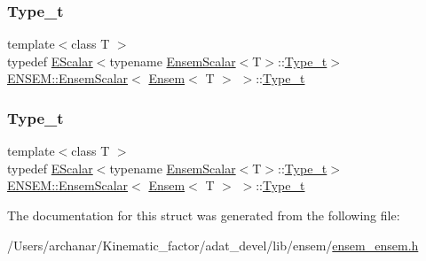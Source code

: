\subsubsection{\texorpdfstring{Type\_t}{Type\_t}\hspace{0.1cm}{\footnotesize\ttfamily [1/2]}}
{\footnotesize\ttfamily template$<$class T $>$ \\
typedef \mbox{\hyperlink{classENSEM_1_1EScalar}{E\+Scalar}}$<$typename \mbox{\hyperlink{structENSEM_1_1EnsemScalar}{Ensem\+Scalar}}$<$T$>$\+::\mbox{\hyperlink{structENSEM_1_1EnsemScalar_3_01Ensem_3_01T_01_4_01_4_a7452a3e2409e2d8a2ae3ea41eec32972}{Type\+\_\+t}}$>$ \mbox{\hyperlink{structENSEM_1_1EnsemScalar}{E\+N\+S\+E\+M\+::\+Ensem\+Scalar}}$<$ \mbox{\hyperlink{classENSEM_1_1Ensem}{Ensem}}$<$ T $>$ $>$\+::\mbox{\hyperlink{structENSEM_1_1EnsemScalar_3_01Ensem_3_01T_01_4_01_4_a7452a3e2409e2d8a2ae3ea41eec32972}{Type\+\_\+t}}}

\mbox{\label{structENSEM_1_1EnsemScalar_3_01Ensem_3_01T_01_4_01_4_a7452a3e2409e2d8a2ae3ea41eec32972}} 
\subsubsection{\texorpdfstring{Type\_t}{Type\_t}\hspace{0.1cm}{\footnotesize\ttfamily [2/2]}}
{\footnotesize\ttfamily template$<$class T $>$ \\
typedef \mbox{\hyperlink{classENSEM_1_1EScalar}{E\+Scalar}}$<$typename \mbox{\hyperlink{structENSEM_1_1EnsemScalar}{Ensem\+Scalar}}$<$T$>$\+::\mbox{\hyperlink{structENSEM_1_1EnsemScalar_3_01Ensem_3_01T_01_4_01_4_a7452a3e2409e2d8a2ae3ea41eec32972}{Type\+\_\+t}}$>$ \mbox{\hyperlink{structENSEM_1_1EnsemScalar}{E\+N\+S\+E\+M\+::\+Ensem\+Scalar}}$<$ \mbox{\hyperlink{classENSEM_1_1Ensem}{Ensem}}$<$ T $>$ $>$\+::\mbox{\hyperlink{structENSEM_1_1EnsemScalar_3_01Ensem_3_01T_01_4_01_4_a7452a3e2409e2d8a2ae3ea41eec32972}{Type\+\_\+t}}}



The documentation for this struct was generated from the following file\+:\begin{DoxyCompactItemize}
\item 
/\+Users/archanar/\+Kinematic\+\_\+factor/adat\+\_\+devel/lib/ensem/\mbox{\hyperlink{lib_2ensem_2ensem__ensem_8h}{ensem\+\_\+ensem.\+h}}\end{DoxyCompactItemize}
